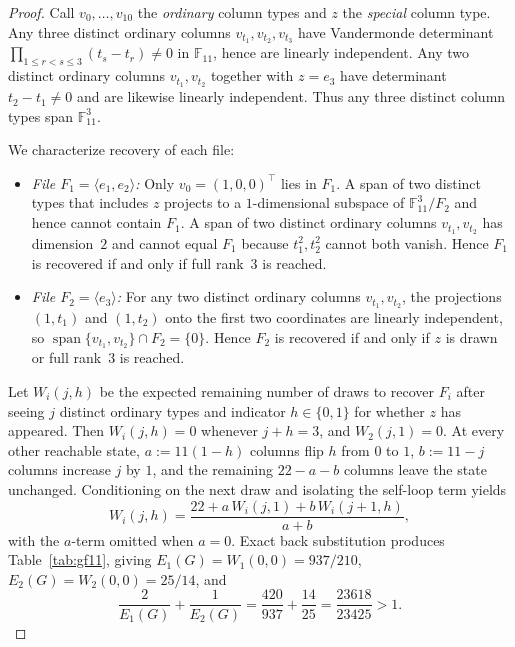 \documentclass[11pt]{article}
\theoremstyle{plain}
\theoremstyle{definition}
\theoremstyle{remark}
\DeclareMathOperator{\spn}{span}
\begin{document}
\begin{proof}
Call $v_0, \dots, v_{10}$ the \emph{ordinary} column types and $z$ the \emph{special} column type.
Any three distinct ordinary columns $v_{t_1}, v_{t_2}, v_{t_3}$ have Vandermonde determinant $\prod_{1 \le r < s \le 3}(t_s - t_r) \neq 0$ in $\mathbb{F}_{11}$, hence are linearly independent.
Any two distinct ordinary columns $v_{t_1}, v_{t_2}$ together with $z = e_3$ have determinant $t_2 - t_1 \neq 0$ and are likewise linearly independent.
Thus any three distinct column types span $\mathbb{F}_{11}^3$.

We characterize recovery of each file:
\begin{itemize}[leftmargin=1.6em]
\item \emph{File $F_1 = \langle e_1, e_2 \rangle$:} Only $v_0 = (1,0,0)^\top$ lies in $F_1$. A span of two distinct types that includes $z$ projects to a $1$-dimensional subspace of $\mathbb{F}_{11}^3 / F_2$ and hence cannot contain $F_1$. A span of two distinct ordinary columns $v_{t_1}, v_{t_2}$ has dimension~$2$ and cannot equal $F_1$ because $t_1^2, t_2^2$ cannot both vanish. Hence $F_1$ is recovered if and only if full rank~$3$ is reached.
\item \emph{File $F_2 = \langle e_3 \rangle$:} For any two distinct ordinary columns $v_{t_1}, v_{t_2}$, the projections $(1, t_1)$ and $(1, t_2)$ onto the first two coordinates are linearly independent, so $\spn\{v_{t_1}, v_{t_2}\} \cap F_2 = \{0\}$. Hence $F_2$ is recovered if and only if $z$ is drawn or full rank~$3$ is reached.
\end{itemize}

Let $W_i(j, h)$ be the expected remaining number of draws to recover $F_i$ after seeing $j$ distinct ordinary types and indicator $h \in \{0, 1\}$ for whether $z$ has appeared.
Then $W_i(j, h) = 0$ whenever $j + h = 3$, and $W_2(j, 1) = 0$.
At every other reachable state, $a := 11(1 - h)$ columns flip $h$ from $0$ to $1$, $b := 11 - j$ columns increase $j$ by $1$, and the remaining $22 - a - b$ columns leave the state unchanged.
Conditioning on the next draw and isolating the self-loop term yields
\[
W_i(j, h) = \frac{22 + a\,W_i(j, 1) + b\,W_i(j + 1, h)}{a + b},
\]
with the $a$-term omitted when $a = 0$.
Exact back substitution produces Table~\ref{tab:gf11}, giving $E_1(G) = W_1(0,0) = 937/210$, $E_2(G) = W_2(0,0) = 25/14$, and
\[
\frac{2}{E_1(G)} + \frac{1}{E_2(G)} = \frac{420}{937} + \frac{14}{25} = \frac{23618}{23425} > 1.
\]


\end{proof}
\end{document}
